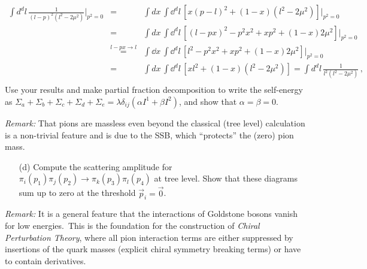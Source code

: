 \documentclass[11pt]{latex/exercise}
\begin{document}
\begin{itemize}
          \begin{eqnarray}
              \int d^d l\,\frac{1}{(l-p)^2\left(l^2-2\mu^2\right)}|_{p^2=0}
              \!\!\!&=&\!\!\!
              \int d x\, \int \dd^d l\, \left[x(p-l)^2+(1-x)(l^2-2\mu^2)\right]|_{p^2=0}
              \nonumber
              \\
              \!\!\!&=&\!\!\!
              \int d x\, \int \dd^d l\, \left[(l-px)^2-p^2x^2+xp^2+(1-x)2\mu^2\right]\big\vert_{p^2=0}
              \nonumber
              \\
              \!\!\!&\overset{l-px\rightarrow l}{=}&\!\!\!
              \int \dd x\, \int \dd^d l\, \left[l^2-p^2x^2+xp^2+(1-x)2\mu^2\right]|_{p^2=0}
              \nonumber
              \\
              \!\!\!&=&\!\!\!
              \int d x\, \int \dd^d l\, \left[xl^2+(1-x)(l^2-2\mu^2)\right]=\int d^d l\,\frac{1}{l^2\left(l^2-2\mu^2\right)}
              \,,
              \nonumber
              \\
          \end{eqnarray}
          Use your results and make partial fraction decomposition to write the self-energy as $\Sigma_{a}+\Sigma_{b}+\Sigma_{c}+\Sigma_{d}+\Sigma_{e} = \lambda \delta_{i j} \left(  \alpha I^1 + \beta I^2 \right)$, and show that $\alpha = \beta = 0$.
\end{itemize}
\emph{Remark:} That pions are massless even beyond the classical (tree level) calculation is a non-trivial feature and is due to the SSB, which ``protects'' the (zero) pion mass.
\begin{itemize}
    \item[(d)] Compute the scattering amplitude for
          $\pi_i(p_1) \pi_j(p_2) \rightarrow \pi_k(p_3) \pi_l(p_4)$
          at tree level.
          Show that these diagrams sum up to zero at the threshold $\vec{p}_i=\vec{0}$.
\end{itemize}
\emph{Remark:} It is a general feature that the interactions of Goldstone bosons vanish for low energies.~This is the foundation for the construction of \emph{Chiral Perturbation Theory}, where all pion interaction terms are either suppressed by insertions of the quark masses (explicit chiral symmetry breaking terms) or have to contain derivatives.
\end{document}
